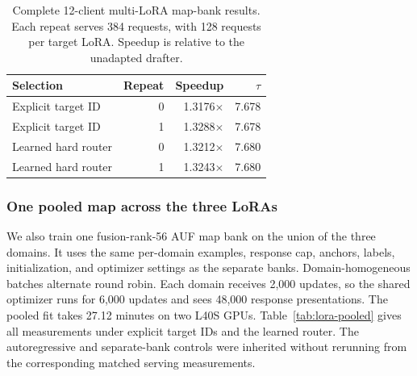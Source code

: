 \begin{table}[htbp]
\centering
\caption{Complete 12-client multi-LoRA map-bank results. Each repeat serves 384 requests, with 128 requests per target LoRA. Speedup is relative to the unadapted drafter.}
\label{tab:lora-router}
\small
\begin{tabular}{lrrr}
\toprule
Selection & Repeat & Speedup & $\tau$ \\
\midrule
Explicit target ID & 0 & 1.3176$\times$ & 7.678 \\
Explicit target ID & 1 & 1.3288$\times$ & 7.678 \\
Learned hard router & 0 & 1.3212$\times$ & 7.680 \\
Learned hard router & 1 & 1.3243$\times$ & 7.680 \\
\bottomrule
\end{tabular}
\end{table}

\subsubsection{One pooled map across the three LoRAs}

We also train one fusion-rank-56 AUF map bank on the union of the three domains.  It uses the same per-domain examples, response cap, anchors, labels, initialization, and optimizer settings as the separate banks.  Domain-homogeneous batches alternate round robin.  Each domain receives 2{,}000 updates, so the shared optimizer runs for 6{,}000 updates and sees 48{,}000 response presentations.  The pooled fit takes 27.12 minutes on two L40S GPUs.  Table~\ref{tab:lora-pooled} gives all measurements under explicit target IDs and the learned router.  The autoregressive and separate-bank controls were inherited without rerunning from the corresponding matched serving measurements.

